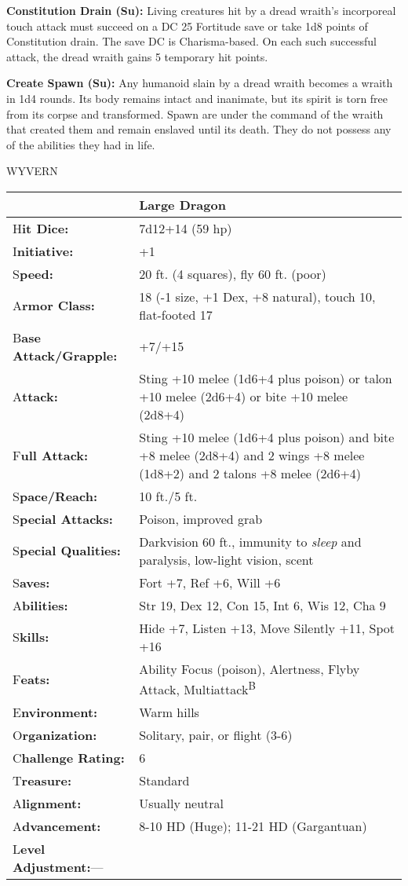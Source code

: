 \documentclass{article}
\begin{document}
\textbf{Constitution Drain (Su):} Living creatures hit by a dread wraith's incorporeal 
touch attack must succeed on a DC 25 Fortitude save or take 1d8 points of Constitution 
drain. The save DC is Charisma-based. On each such successful attack, the dread 
wraith gains 5 temporary hit points.

\textbf{Create Spawn (Su): }Any humanoid slain by a dread wraith becomes a wraith 
in 1d4 rounds. Its body remains intact and inanimate, but its spirit is torn free 
from its corpse and transformed. Spawn are under the command of the wraith that 
created them and remain enslaved until its death. They do not possess any of the 
abilities they had in life.

\vspace{12pt}
{\LARGE{}WYVERN}

\begin{tabular}{|>{\raggedright}p{91pt}|>{\raggedright}p{235pt}|}
\hline
  & Large Dragon\tabularnewline
\hline
H\textbf{it Dice:} & 7d12+14 (59 hp)\tabularnewline
\hline
I\textbf{nitiative:} & +1\tabularnewline
\hline
S\textbf{peed:} & 20 ft. (4 squares), fly 60 ft. (poor)\tabularnewline
\hline
A\textbf{rmor Class:} & 18 (-1 size, +1 Dex, +8 natural), touch 10, flat-footed 
17\tabularnewline
\hline
B\textbf{ase Attack/Grapple:} & +7/+15\tabularnewline
\hline
A\textbf{ttack:} & Sting +10 melee (1d6+4 plus poison) or talon +10 melee (2d6+4) 
or bite +10 melee (2d8+4)\tabularnewline
\hline
F\textbf{ull Attack:} & Sting +10 melee (1d6+4 plus poison) and bite +8 melee (2d8+4) 
and 2 wings +8 melee (1d8+2) and 2 talons +8 melee (2d6+4) \tabularnewline
\hline
S\textbf{pace/Reach:} & 10 ft./5 ft.\tabularnewline
\hline
S\textbf{pecial Attacks:} & Poison, improved grab\tabularnewline
\hline
S\textbf{pecial Qualities:} & Darkvision 60 ft., immunity to \textit{sleep }and 
paralysis, low-light vision, scent\tabularnewline
\hline
S\textbf{aves:} & Fort +7, Ref +6, Will +6\tabularnewline
\hline
A\textbf{bilities:} & Str 19, Dex 12, Con 15, Int 6, Wis 12, Cha 9\tabularnewline
\hline
S\textbf{kills:} & Hide +7, Listen +13, Move Silently +11, Spot +16 \tabularnewline
\hline
F\textbf{eats:} & Ability Focus (poison), Alertness, Flyby Attack, Multiattack\textsuperscript{B}\tabularnewline
\hline
E\textbf{nvironment:} & Warm hills\tabularnewline
\hline
O\textbf{rganization:} & Solitary, pair, or flight (3-6)\tabularnewline
\hline
C\textbf{hallenge Rating:} & 6\tabularnewline
\hline
T\textbf{reasure:} & Standard\tabularnewline
\hline
A\textbf{lignment:} & Usually neutral\tabularnewline
\hline
A\textbf{dvancement:} & 8-10 HD (Huge); 11-21 HD (Gargantuan)\tabularnewline
\hline
L\textbf{evel Adjustment:}--- & \tabularnewline
\hline
\end{tabular}
\end{document}

